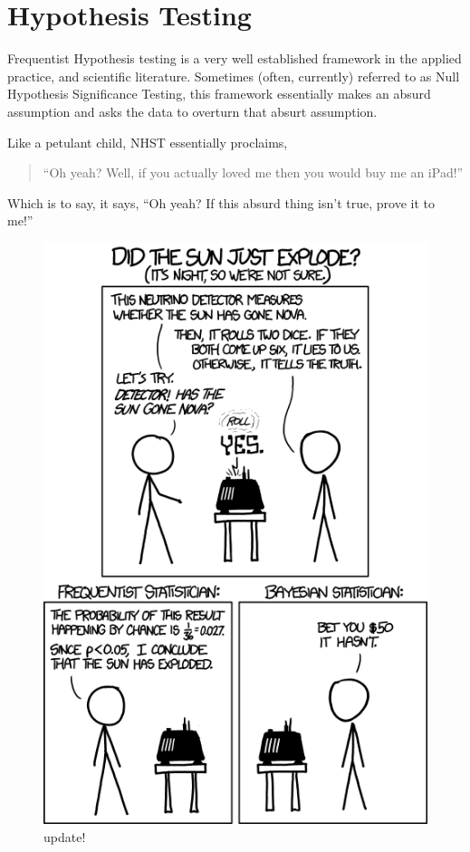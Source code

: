 \documentclass[
]{book}
\theoremstyle{definition}
\theoremstyle{definition}
\theoremstyle{definition}
\theoremstyle{definition}
\theoremstyle{remark}
\begin{document}
\hypertarget{hypothesis-testing}{%
\chapter{Hypothesis Testing}\label{hypothesis-testing}}

Frequentist Hypothesis testing is a very well established framework in the applied practice, and scientific literature. Sometimes (often, currently) referred to as Null Hypothesis Significance Testing, this framework essentially makes an absurd assumption and asks the data to overturn that absurt assumption.

Like a petulant child, NHST essentially proclaims,

\begin{quote}
``Oh yeah? Well, if you actually loved me then you would buy me an iPad!''
\end{quote}

Which is to say, it says, ``Oh yeah? If this absurd thing isn't true, prove it to me!''

\begin{figure}
\centering
\includegraphics{./images/frequentists_vs_bayesians.png}
\caption{update!}
\end{figure}
\end{document}
